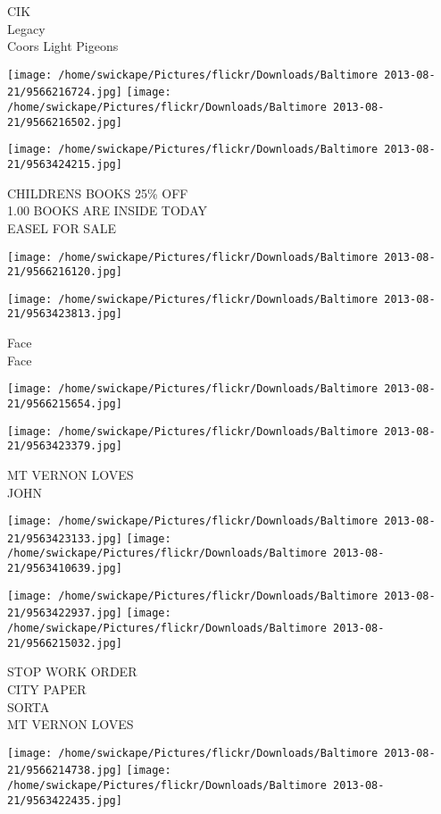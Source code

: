 \documentclass[10pt,letterpaper]{article}
\begin{document}
CIK\\
Legacy\\
Coors Light Pigeons
\pagebreak

\texttt{[image: /home/swickape/Pictures/flickr/Downloads/Baltimore 2013-08-21/9566216724.jpg]}
\texttt{[image: /home/swickape/Pictures/flickr/Downloads/Baltimore 2013-08-21/9566216502.jpg]}

\texttt{[image: /home/swickape/Pictures/flickr/Downloads/Baltimore 2013-08-21/9563424215.jpg]}

CHILDRENS BOOKS 25\% OFF\\
1.00 BOOKS ARE INSIDE TODAY\\
EASEL FOR SALE
\pagebreak

\texttt{[image: /home/swickape/Pictures/flickr/Downloads/Baltimore 2013-08-21/9566216120.jpg]}

\vspace{0.25in}
\texttt{[image: /home/swickape/Pictures/flickr/Downloads/Baltimore 2013-08-21/9563423813.jpg]}

Face\\
Face
\pagebreak

\texttt{[image: /home/swickape/Pictures/flickr/Downloads/Baltimore 2013-08-21/9566215654.jpg]}

\vspace{0.25in}
\texttt{[image: /home/swickape/Pictures/flickr/Downloads/Baltimore 2013-08-21/9563423379.jpg]}

MT VERNON LOVES\\
JOHN
\pagebreak

\texttt{[image: /home/swickape/Pictures/flickr/Downloads/Baltimore 2013-08-21/9563423133.jpg]}
\texttt{[image: /home/swickape/Pictures/flickr/Downloads/Baltimore 2013-08-21/9563410639.jpg]}

\texttt{[image: /home/swickape/Pictures/flickr/Downloads/Baltimore 2013-08-21/9563422937.jpg]}
\texttt{[image: /home/swickape/Pictures/flickr/Downloads/Baltimore 2013-08-21/9566215032.jpg]}

STOP WORK ORDER\\
CITY PAPER\\
SORTA\\
MT VERNON LOVES
\pagebreak

\texttt{[image: /home/swickape/Pictures/flickr/Downloads/Baltimore 2013-08-21/9566214738.jpg]}
\texttt{[image: /home/swickape/Pictures/flickr/Downloads/Baltimore 2013-08-21/9563422435.jpg]}
\end{document}
